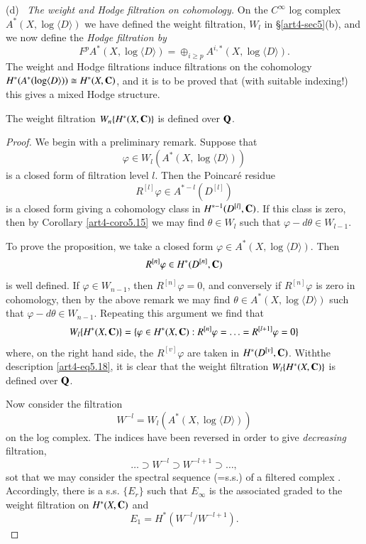 \medskip
(d)~ \textit{The weight and Hodge filtration on cohomology.} On the $C^\infty$ log complex $A^\ast (X, \log \langle D \rangle)$ we have defined the weight filtration, $W_l$ in \S \ref{art4-sec5}(b), and we now define the \textit{Hodge filtration by}
\begin{equation}
F^p A^{\ast} (X, \log \langle D \rangle) = \oplus_{i \geqslant p} A^{i,\ast} (X, \log \langle D \rangle) .
\label{art4-eq5.16}
\end{equation}
The weight and Hodge filtrations induce filtrations on the cohomology $H^\ast (A^\ast (\log \langle D \rangle)) \cong H^\ast (X, \mathbf{C})$, and it is to be proved that (with suitable indexing!) this gives a mixed Hodge structure.

\begin{proposition}\label{art4-prop5.17}
The weight filtration $W_n \{H^\ast (X, \mathbf{C})\}$ is defined over $\mathbf{Q}$.
\end{proposition}

\begin{proof}
We begin with a preliminary remark. Suppose that 
$$
\varphi \in W_l (A^\ast (X, \log \langle D \rangle))
$$
is a closed form of filtration level $l$. Then the Poincar\'e residue
$$
R^{[l]} \varphi \in A^{\ast -l} (D^{[l]})
$$
is a closed form giving a cohomology class in $H^{\ast-1} (D^{[l]}, \mathbf{C})$. If this class is zero, then by Corollary \ref{art4-coro5.15} we may find $\theta \in W_l$ such that $\varphi -d \theta \in W_{l-1}$.

To prove the proposition, we take a closed form $\varphi\in A^{\ast} (X, \log \langle D \rangle)$. Then
$$
R^{[n]} \varphi \in H^\ast (D^{[n]} , \mathbf{C})
$$
is well defined. If $\varphi \in W_{n-1}$, then $R^{[n]} \varphi =0$, and conversely if $R^{[n]} \varphi$ is zero in cohomology, then by the above remark we may find $\theta \in A^\ast (X, \log \langle D \rangle)$ such that $\varphi - d \theta \in W_{n-1}$. Repeating this argument we find that 
\begin{equation}
W_l \{H^\ast (X,\mathbf{C})\} = \{\varphi \in H^\ast (X, \mathbf{C}): R^{[n]} \varphi = \ldots = R^{[l+1]} \varphi =0\} \label{art4-eq5.18}
\end{equation} 
where, on the right hand side, the $R^{[v]}\varphi$ are taken in $H^\ast (D^{[v]}, \mathbf{C})$. With\pageoriginale the description \eqref{art4-eq5.18}, it is clear that the weight filtration $W_l \{H^\ast (X, \mathbf{C})\}$ is defined over $\mathbf{Q}$.

Now consider the filtration
\begin{equation}
W^{-l} = W_l (A^\ast (X, \log \langle D \rangle))
\label{art4-eq5.19}
\end{equation}
on the log complex. The indices have been reversed in order to give \textit{decreasing} filtration,
$$
\ldots \supset W^{-l} \supset W^{-l+1} \supset \ldots,
$$
sot that we may consider the spectral sequence (=s.s.) of a filtered complex \cite{art4-key17}. Accordingly, there is a s.s. $\{E_r\}$ such that $E_\infty$ is the associated graded to the weight filtration on $H^\ast (X, \mathbf{C})$ and 
$$
E_1 = H^\ast (W^{-l}/ W^{-l+1}).
$$
\end{proof}

